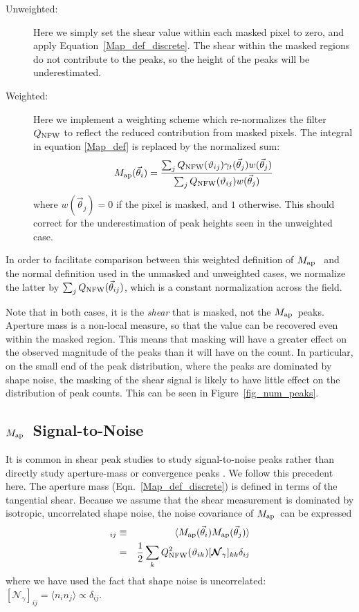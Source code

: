\documentclass[twocolumn]{emulateapj}
\newcommand{\mymat}[1]{\boldsymbol{#1}}
\newcommand{\Map}{\ensuremath{M_{\rm ap}}\ }
\newcommand{\Noise}{\mymat{\mathcal{N}}}
\begin{document}
\begin{description}
  \item[Unweighted:] Here we simply set the shear value within each 
    masked pixel to zero, and apply Equation~\ref{Map_def_discrete}.  
    The shear within the masked regions do not contribute to the peaks, so the
    height of the peaks will be underestimated.
  \item[Weighted:] Here we implement a weighting scheme which
    re-normalizes the filter $Q_{\rm NFW}$ to reflect the
    reduced contribution from masked pixels.  The integral in 
    equation \ref{Map_def} is replaced by the normalized sum:
    \begin{equation}
      M_{\rm ap}(\vec\theta_i) 
      = \frac{\sum_j 
        Q_{\rm NFW}(\vartheta_{ij})
        \gamma_t(\vec\theta_j)w(\vec\theta_j)}
      {\sum_j 
        Q_{\rm NFW}(\vartheta_{ij})w(\vec\theta_j)}
    \end{equation}
    where $w(\vec\theta_j) = 0$ if the pixel is masked, and 
    $1$ otherwise.  This should correct for the underestimation of peak
    heights seen in the unweighted case.
\end{description}
In order to facilitate comparison between this weighted definition of \Map 
and the normal definition used in the unmasked and unweighted cases, 
we normalize the latter by $\sum_j Q_{\rm NFW}(\vec\theta_{ij})$, 
which is a constant normalization across the field.

Note that in both cases, it is the \textit{shear} that is masked, not the
\Map peaks.  Aperture mass is a non-local measure, so that the value can
be recovered even within the masked region.  This means that
masking will have a greater effect on the observed magnitude of the peaks
than it will have on the count.  In particular, on the small end of the
peak distribution, where the peaks are dominated by shape noise, the
masking of the shear signal is likely to have little effect on the
distribution of peak counts.  This can be seen in Figure~\ref{fig_num_peaks}.

\subsection{\Map Signal-to-Noise}
It is common in shear peak studies to study signal-to-noise peaks 
rather than directly study aperture-mass or convergence
peaks \citep[e.g.~][]{Wang09,Dietrich10,Schmidt10}.
We follow this precedent here.  
The aperture mass (Eqn.~\ref{Map_def_discrete}) is defined in terms of the
tangential shear.  Because we assume that the shear measurement is dominated
by isotropic, uncorrelated shape noise, the noise covariance of 
\Map can be expressed
\begin{eqnarray}
  [\Noise_M]_{ij} &\equiv& \langle M_{\rm ap}(\vec\theta_i) 
  M_{\rm ap}(\vec\theta_j)\rangle  \nonumber\\
  & = & \frac{1}{2}\sum_{k}
  Q^2_{\rm NFW}(\vartheta_{ik}) [\Noise_\gamma]_{kk} \delta_{ij}
\end{eqnarray}
where we have used the fact that shape noise is uncorrelated:
$[\Noise_\gamma]_{ij} = \langle n_i n_j\rangle \propto \delta_{ij}$.
\end{document}
